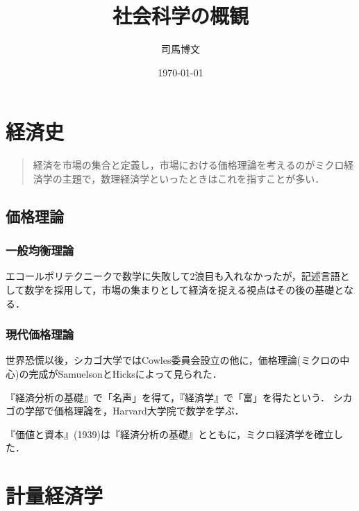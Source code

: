 \documentclass[uplatex,dvipdfmx]{jsreport}
\title{社会科学の概観}
\author{司馬博文}
\date{\today}
\begin{document}
\tableofcontents

\chapter{経済史}

\begin{quotation}
    経済を市場の集合と定義し，市場における価格理論を考えるのがミクロ経済学の主題で，数理経済学といったときはこれを指すことが多い．
\end{quotation}

\section{価格理論}

\subsection{一般均衡理論}

\begin{history}
    エコールポリテクニークで数学に失敗して2浪目も入れなかったが，記述言語として数学を採用して，市場の集まりとして経済を捉える視点はその後の基礎となる．
\end{history}

\subsection{現代価格理論}

\begin{tcolorbox}[colframe=ForestGreen, colback=ForestGreen!10!white,breakable,colbacktitle=ForestGreen!40!white,coltitle=black,fonttitle=\bfseries\sffamily,
title=]
    世界恐慌以後，シカゴ大学ではCowles委員会設立の他に，価格理論(ミクロの中心)の完成がSamuelsonとHicksによって見られた．
\end{tcolorbox}

\begin{history}
    『経済分析の基礎』\cite{Samuelson}で「名声」を得て，『経済学』で「富」を得たという．
    シカゴの学部で価格理論を，Harvard大学院で数学を学ぶ．
\end{history}

\begin{history}
    『価値と資本』(1939)は『経済分析の基礎』\cite{Samuelson}とともに，ミクロ経済学を確立した．
\end{history}

\chapter{計量経済学}
\end{document}
